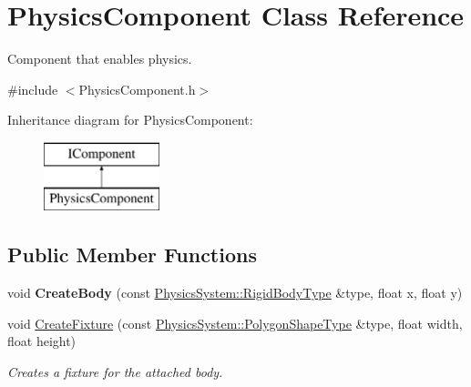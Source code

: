 \hypertarget{struct_physics_component}{}\section{Physics\+Component Class Reference}
\label{struct_physics_component}


Component that enables physics.  




{\ttfamily \#include $<$Physics\+Component.\+h$>$}

Inheritance diagram for Physics\+Component\+:\begin{figure}[H]
\begin{center}
\leavevmode
\includegraphics[height=2.000000cm]{struct_physics_component}
\end{center}
\end{figure}
\subsection*{Public Member Functions}
\begin{DoxyCompactItemize}
\item 
\mbox{\label{struct_physics_component_a9bf7b6448791c90e0f6f9dc3f3c01536}} 
void {\bfseries Create\+Body} (const \mbox{\hyperlink{class_physics_system_aa9b3a5f5c38063cdc3a78717250a239e}{Physics\+System\+::\+Rigid\+Body\+Type}} \&type, float x, float y)
\item 
\mbox{\label{struct_physics_component_a201127e5510341424e8cdd1663b26d79}} 
void \mbox{\hyperlink{struct_physics_component_a201127e5510341424e8cdd1663b26d79}{Create\+Fixture}} (const \mbox{\hyperlink{class_physics_system_ac3b7ef40b19864e4ecdec88af3420a89}{Physics\+System\+::\+Polygon\+Shape\+Type}} \&type, float width, float height)
\begin{DoxyCompactList}\small\item\em Creates a fixture for the attached body. \end{DoxyCompactList}\end{DoxyCompactItemize}
